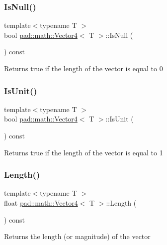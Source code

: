 \subsubsection{\texorpdfstring{Is\+Null()}{IsNull()}}
{\footnotesize\ttfamily template$<$typename T $>$ \\
bool \mbox{\hyperlink{structpad_1_1math_1_1_vector4}{pad\+::math\+::\+Vector4}}$<$ T $>$\+::Is\+Null (\begin{DoxyParamCaption}{ }\end{DoxyParamCaption}) const}

Returns true if the length of the vector is equal to 0 \mbox{\label{structpad_1_1math_1_1_vector4_a194b228f5e0d3d8171daaa78927a7bd3}} 
\subsubsection{\texorpdfstring{Is\+Unit()}{IsUnit()}}
{\footnotesize\ttfamily template$<$typename T $>$ \\
bool \mbox{\hyperlink{structpad_1_1math_1_1_vector4}{pad\+::math\+::\+Vector4}}$<$ T $>$\+::Is\+Unit (\begin{DoxyParamCaption}{ }\end{DoxyParamCaption}) const}

Returns true if the length of the vector is equal to 1 \mbox{\label{structpad_1_1math_1_1_vector4_ac374b52275efc5f8e8b988e347fc340e}} 
\subsubsection{\texorpdfstring{Length()}{Length()}}
{\footnotesize\ttfamily template$<$typename T $>$ \\
float \mbox{\hyperlink{structpad_1_1math_1_1_vector4}{pad\+::math\+::\+Vector4}}$<$ T $>$\+::Length (\begin{DoxyParamCaption}{ }\end{DoxyParamCaption}) const}

Returns the length (or magnitude) of the vector \mbox{\label{structpad_1_1math_1_1_vector4_ae79f5cf216a4270769bfb88a54d0541d}} 
